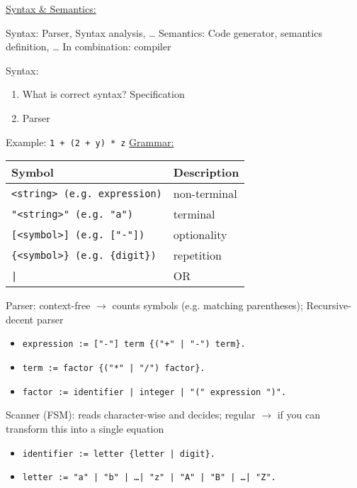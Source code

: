 \par{
	\noindent\underline{Syntax \& Semantics:}
	\par{
		\noindent
		Syntax: Parser, Syntax analysis, \ldots \newline
		Semantics: Code generator, semantics definition, \ldots \newline
		In combination: compiler
	}
	\par{
		\noindent Syntax:
		\parskip0pt\begin{enumerate}
			\item{What is correct syntax? Specification}
			\item{Parser}
		\end{enumerate}
	}
	\par{
		\noindent
		Example: \texttt{1 + (2 + y) * z} \newline\newline
		\underline{Grammar:}
		\par{
			\noindent
			\begin{center}
				\begin{tabular}{|l|l|}	
					\hline
					Symbol 									&	Description		\tabularnewline
					\hline
					\texttt{<string> (e.g. expression)}		&	non-terminal	\tabularnewline
					\texttt{"<string>" (e.g. "a")}			&	terminal 		\tabularnewline
					\texttt{[<symbol>] (e.g. ["-"])}		&	optionality		\tabularnewline
					\texttt{\{<symbol>\} (e.g. \{digit\})}	&	repetition		\tabularnewline
					\texttt{|}								&	OR 				\tabularnewline
					\hline
				\end{tabular}
			\end{center}
		}
		\noindent Parser: context-free $\rightarrow$ counts symbols (e.g. matching parentheses); Recursive-decent parser
		\parskip0pt\begin{itemize}
			\item[]{\texttt{expression := ["-"] term \{("+" | "-") term\}.}}
			\item[]{\texttt{term := factor \{("*" | "/") factor\}.}}
			\item[]{\texttt{factor := identifier | integer | "(" expression ")".}}
		\end{itemize}
		Scanner (FSM): reads character-wise and decides; regular $\rightarrow$ if you can transform this into a single equation
		\parskip0pt\begin{itemize}
			\item[]{\texttt{identifier := letter \{letter | digit\}.}}
			\item[]{\texttt{letter := "a" | "b" | \ldots | "z" | "A" | "B" | \ldots | "Z".}}

\end{itemize}}}
